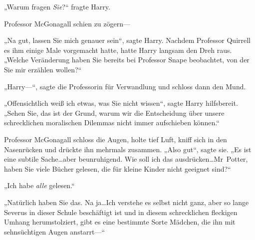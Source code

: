 „Warum fragen \emph{Sie}?“ fragte Harry.

Professor McGonagall schien zu zögern—

„Na gut, lassen Sie mich genauer sein“, sagte Harry. Nachdem Professor Quirrell es ihm einige Male vorgemacht hatte, hatte Harry langsam den Dreh raus.
„Welche Veränderung haben Sie bereits bei Professor Snape beobachtet, von der Sie mir erzählen wollen?“

„Harry—“, sagte die Professorin für Verwandlung und schloss dann den Mund.

„Offensichtlich weiß ich etwas, was Sie nicht wissen“, sagte Harry hilfsbereit. „Sehen Sie, das ist der Grund, warum wir die Entscheidung über unsere schrecklichen moralischen Dilemmas nicht immer aufschieben können.“

Professor McGonagall schloss die Augen, holte tief Luft, kniff sich in den Nasenrücken und drückte ihn mehrmals zusammen.
„Also gut“, sagte sie. „Es ist eine subtile Sache…aber beunruhigend. Wie soll ich das ausdrücken…Mr~Potter, haben Sie viele Bücher gelesen, die für kleine Kinder nicht geeignet sind?“

„Ich habe \emph{alle} gelesen.“

„Natürlich haben Sie das. Na ja…Ich verstehe es selbst nicht ganz, aber so lange Severus in dieser Schule beschäftigt ist und in diesem schrecklichen fleckigen Umhang herumstolziert, gibt es eine bestimmte Sorte Mädchen, die ihn mit sehnsüchtigen Augen anstarrt—“

